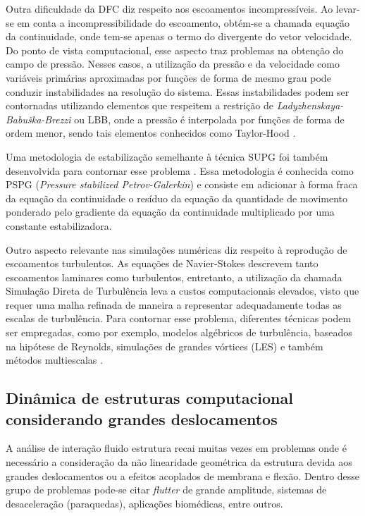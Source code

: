 \documentclass[tese_patricia.tex]{subfiles}
\begin{document}
Outra dificuldade da DFC diz respeito aos escoamentos incompressíveis. Ao levar-se em conta a incompressibilidade do escoamento, obtém-se a chamada equação da continuidade, onde tem-se apenas o termo do divergente do vetor velocidade. Do ponto de vista computacional, esse aspecto traz problemas na obtenção do campo de pressão. Nesses casos, a utilização da pressão e da velocidade como variáveis primárias aproximadas por funções de forma de mesmo grau pode conduzir instabilidades na resolução do sistema. Essas instabilidades podem ser contornadas utilizando elementos que respeitem a restrição de \textit{Ladyzhenskaya-Babuška-Brezzi} ou LBB, onde a pressão é interpolada por funções de forma de ordem menor, sendo tais elementos conhecidos como Taylor-Hood \cite{BrezziF:1991,ZienkiewiczTN:2005,StrangF:2008}.

Uma metodologia de estabilização semelhante à técnica SUPG foi também desenvolvida para contornar esse problema \cite{HughesFB:1986,TezduyarMRS:1992a}. Essa metodologia é conhecida como PSPG (\textit{Pressure stabilized Petrov-Galerkin}) e consiste em adicionar à forma fraca da equação da continuidade o resíduo da equação da quantidade de movimento ponderado pelo gradiente da equação da continuidade multiplicado por uma constante estabilizadora.

Outro aspecto relevante nas simulações numéricas diz respeito à reprodução de escoamentos turbulentos. As equações de Navier-Stokes descrevem tanto escoamentos laminares como turbulentos, entretanto, a utilização da chamada Simulação Direta de Turbulência leva a custos computacionais elevados, visto que requer uma malha refinada de maneira a representar adequadamente todas as escalas de turbulência. Para contornar esse problema, diferentes técnicas podem ser empregadas, como por exemplo, modelos algébricos de turbulência, baseados na hipótese de Reynolds, simulações de grandes vórtices (LES) \cite{LaunderS:1972,Wilcox:1993} e também métodos multiescalas \cite{Hughesetal:2001,Sondak:2015}.

\subsection{Dinâmica de estruturas computacional considerando grandes deslocamentos}
\label{csdsection}

A análise de interação fluido estrutura recai muitas vezes em problemas onde é necessário a consideração da não linearidade geométrica da estrutura devida aos grandes deslocamentos ou a efeitos acoplados de membrana e flexão. Dentro desse grupo de problemas pode-se citar \textit{flutter} de grande amplitude, sistemas de desaceleração (paraquedas), aplicações biomédicas, entre outros.
\end{document}

